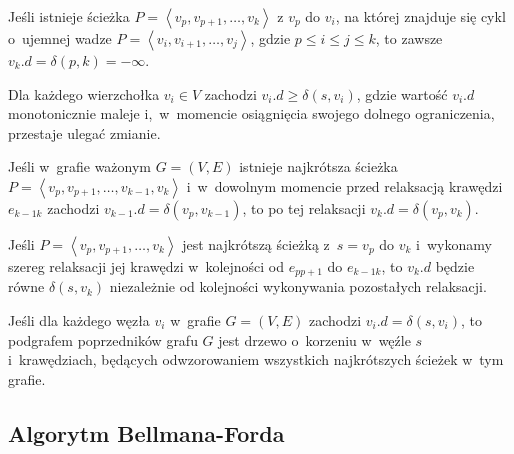 \begin{lemma}\label{lem:pathWithNegativeCycle}
	Jeśli istnieje ścieżka $P = \left \langle v_{p}, v_{p+1}, \dots, v_{k} \right \rangle$ z $v_{p}$ do $v_{i}$, na której znajduje się cykl o~ujemnej wadze $P = \left \langle v_{i}, v_{i+1}, \dots, v_{j} \right \rangle$, gdzie $p \leqslant i \leqslant j \leqslant k$, to zawsze $v_{k}.d = \delta \left( p, k \right) = - \infty$.
\end{lemma}

\begin{lemma}\label{lem:costUpperBound}
	Dla każdego wierzchołka $v_{i} \in V$ zachodzi $v_{i}.d \geqslant \delta \left( s, v_{i} \right)$, gdzie wartość $v_{i}.d$ monotonicznie maleje i,~w~momencie osiągnięcia swojego dolnego ograniczenia, przestaje ulegać zmianie.
\end{lemma}

\begin{lemma}\label{lem:convergenceProperty}
	Jeśli w~grafie ważonym $G = \left( V, E \right)$ istnieje najkrótsza ścieżka $P = \left \langle v_{p}, v_{p+1}, \dots, v_{k-1}, v_{k} \right \rangle$ i~w~dowolnym momencie przed relaksacją krawędzi $e_{k-1k}$ zachodzi $ v_{k-1}.d = \delta \left( v_{p}, v_{k-1} \right)$, to po tej relaksacji $v_{k}.d = \delta \left( v_{p}, v_{k} \right)$.
\end{lemma}

\begin{lemma}\label{lem:pathRelaxation}
	Jeśli $P = \left \langle v_{p}, v_{p+1}, \dots, v_{k} \right \rangle $ jest najkrótszą ścieżką z~$s = v_{p}$ do $v_{k}$ i~wykonamy szereg relaksacji jej krawędzi w~kolejności od $e_{pp+1}$ do $e_{k-1k}$, to $v_{k}.d$ będzie równe $ \delta \left( s, v_{k}\right)$ niezależnie od kolejności wykonywania pozostałych relaksacji.
\end{lemma}

\begin{lemma}\label{lem:parentSubgraph}
	Jeśli dla każdego węzła $v_{i}$ w~grafie $G = \left( V, E \right)$ zachodzi $v_{i}.d = \delta \left( s, v_{i} \right)$, to podgrafem poprzedników grafu $G$ jest drzewo o~korzeniu w~węźle $s$ i~krawędziach, będących odwzorowaniem wszystkich najkrótszych ścieżek w~tym grafie.
\end{lemma}



\subsection{Algorytm Bellmana-Forda}



